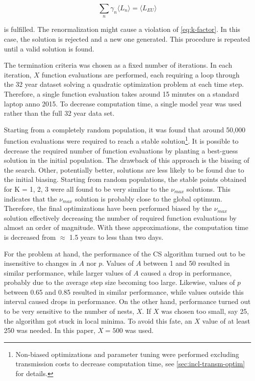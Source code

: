 \documentclass[a4paper, 12pt, sort&compress]{elsarticle}%
\begin{document}
\begin{equation}
  \label{eq:10}
  \sum_{n} \gamma_{n} \langle L_{n} \rangle = \langle L_{EU} \rangle
\end{equation}

is fulfilled. The renormalization might cause a violation of
\cref{eq:k-factor}. In this case, the solution is rejected and a
new one generated. This procedure is repeated until a valid solution
is found.

The termination criteria was chosen as a fixed number of
iterations. In each iteration, $X$ function evaluations are performed,
each requiring a loop through the 32 year dataset solving a quadratic
optimization problem at each time step. Therefore, a single function
evaluation takes around 15 minutes on a standard laptop anno 2015. To
decrease computation time, a single model year was used rather than
the full 32 year data set.

Starting from a completely random population, it was found that around
50,000 function evaluations were required to reach a stable
solution\footnote{Non-biased optimizations and parameter tuning were
  performed excluding transmission costs to decrease computation time,
  see \cref{sec:incl-transm-optim} for details.}.
It is possible to decrease the required number of function evaluations
by planting a best-guess solution in the initial population. The
drawback of this approach is the biasing of the search. Other,
potentially better, solutions are less likely to be found due to the
initial biasing. Starting from random populations, the stable points
obtained for K = 1, 2, 3 were all found to be very similar to the
$\nu_{max}$ solutions. This indicates that the $\nu_{max}$ solution is
probably close to the global optimum. Therefore, the final
optimizations have been performed biased by the $\nu_{max}$ solution
effectively decreasing the number of required function evaluations by
almost an order of magnitude. With these approximations, the
computation time is decreased from $\approx$ 1.5 years to less than
two days.

For the problem at hand, the performance of the CS algorithm turned
out to be insensitive to changes in $A$ nor $p$. Values of $A$ between
1 and 50 resulted in similar performance, while larger values of $A$
caused a drop in performance, probably due to the average step size
becoming too large. Likewise, values of $p$ between 0.65 and 0.85
resulted in similar performance, while values outside this interval
caused drops in performance. On the other hand, performance turned out
to be very sensitive to the number of nests, $X$. If $X$ was chosen
too small, say 25, the algorithm got stuck in local minima. To avoid
this fate, an $X$ value of at least 250 was needed. In this paper,
$X = 500$ was used.
\end{document}
